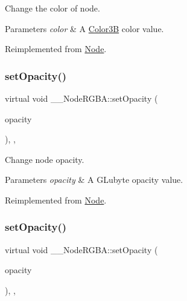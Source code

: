 Change the color of node. 
\begin{DoxyParams}{Parameters}
{\em color} & A \hyperlink{structColor3B}{Color3B} color value. \\
\hline
\end{DoxyParams}


Reimplemented from \hyperlink{classNode_af45037de5b13602263b1ce51b50cafdd}{Node}.

\mbox{\label{class____NodeRGBA_aa0ac4f9dca25f519f175e668ba4f3306}} 
\subsubsection{\texorpdfstring{set\+Opacity()}{setOpacity()}\hspace{0.1cm}{\footnotesize\ttfamily [1/2]}}
{\footnotesize\ttfamily virtual void \+\_\+\+\_\+\+Node\+R\+G\+B\+A\+::set\+Opacity (\begin{DoxyParamCaption}\item[{G\+Lubyte}]{opacity }\end{DoxyParamCaption})\hspace{0.3cm}{\ttfamily [inline]}, {\ttfamily [override]}, {\ttfamily [virtual]}}

Change node opacity. 
\begin{DoxyParams}{Parameters}
{\em opacity} & A G\+Lubyte opacity value. \\
\hline
\end{DoxyParams}


Reimplemented from \hyperlink{classNode_ae41a9db63bfa3d466ee7c9d79c35352d}{Node}.

\mbox{\label{class____NodeRGBA_aa0ac4f9dca25f519f175e668ba4f3306}} 
\subsubsection{\texorpdfstring{set\+Opacity()}{setOpacity()}\hspace{0.1cm}{\footnotesize\ttfamily [2/2]}}
{\footnotesize\ttfamily virtual void \+\_\+\+\_\+\+Node\+R\+G\+B\+A\+::set\+Opacity (\begin{DoxyParamCaption}\item[{G\+Lubyte}]{opacity }\end{DoxyParamCaption})\hspace{0.3cm}{\ttfamily [inline]}, {\ttfamily [override]}, {\ttfamily [virtual]}}

